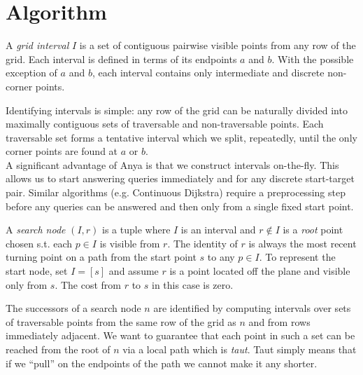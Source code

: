 \section{Algorithm}

\begin{defi}
\label{defi::interval}
A \emph{grid interval} $I$ is a set of contiguous pairwise visible points 
from any row of the grid.  Each interval is defined in terms 
of its endpoints $a$ and $b$. 
With the possible exception of $a$ and $b$, each interval
contains only intermediate and discrete non-corner points.
\end{defi}
Identifying intervals is simple: any row of the grid can be naturally divided
into maximally contiguous sets of traversable and non-traversable points.
Each traversable set forms a tentative interval which we split, repeatedly,
until the only corner points are found at $a$ or $b$.
\\
A significant advantage of Anya is that we construct intervals on-the-fly.
This allows us to start answering queries immediately and for any discrete
start-target pair. Similar algorithms (e.g. Continuous Dijkstra) require
a preprocessing step before any queries can be answered and then only
from a single fixed start point. 

\begin{defi}
\label{defi:searchnode}
A \emph{search node} $(I, r)$ is a tuple where $I$ is an interval and 
$r \not \in I$ is a \emph{root} point chosen s.t. each $p \in I$  
is visible from $r$. The identity of $r$ is always the most
recent turning point on a path from the start point $s$ to any $p \in I$.
To represent the start node, set $I = [s]$ and assume $r$ is a point located 
off the plane and visible only from $s$. The cost from $r$ to $s$ in this case
is zero.
\end{defi}
The successors of a search node $n$ are identified by computing intervals
over sets of traversable points from the same row of the grid as $n$ and from rows
immediately adjacent. We want to guarantee that each point in such
a set can be reached from the root of $n$ via a local path which is \emph{taut}.
Taut simply means that if we ``pull'' on the endpoints of the path we cannot
make it any shorter.

